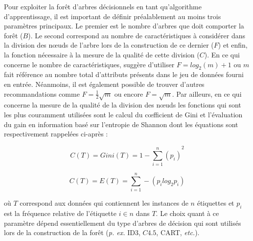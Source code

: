 Pour exploiter la forêt d'arbres décisionnels en tant qu'algorithme d'apprentissage, il est important de définir préalablement au moins trois paramètres principaux. Le premier est le nombre d'arbres que doit comporter la forêt ($B$). Le second correspond au nombre de caractéristiques à considérer dans la division des n\oe{}uds de l'arbre lors de la construction de ce dernier ($F$) et enfin, la fonction nécessaire à la mesure de la qualité de cette division ($C$). En ce qui concerne le nombre de caractéristiques, \citeauthor{Breiman2001} suggère d'utiliser $F=log_2(m) + 1$ ou $m$ fait référence au nombre total d'attributs présents dans le jeu de données fourni en entrée. Néanmoins, il est également possible de trouver d'autres recommandations comme $F=\frac{1}{2}\sqrt{m}$ ou encore $F=\sqrt{m}$. Par ailleurs, en ce qui concerne la mesure de la qualité de la division des n\oe{}uds les fonctions qui sont les plus couramment utilisées sont le calcul du c\oe{}fficient de Gini et l'évaluation du gain en information basé sur l'entropie de Shannon dont les équations sont respectivement rappelées ci-après :

\begin{equation}
	\label{eq:gini}
	C(T) = Gini(T) = {1-\sum_{i=1}^{n}(p_i)}^2
\end{equation}

\begin{equation}
	\label{eq:gain}
	C(T) = E(T) = \sum_{i=1}^{n}-(p_i log_2 p_i)
\end{equation}

\noindent où $T$ correspond aux données qui contiennent les instances de $n$ étiquettes et $p_i$ est la fréquence relative de l'étiquette $i \in n$ dans $T$. Le choix quant à ce paramètre dépend essentiellement du type d'arbres de décision qui sont utilisés lors de la construction de la forêt (\textit{p. ex.} ID3, $C4.5$, CART, \textit{etc.}).

